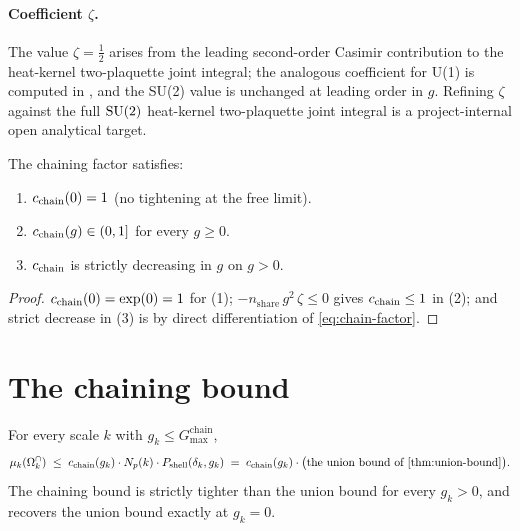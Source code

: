 \paragraph*{Coefficient $\zeta$.}  The value $\zeta = \tfrac12$
arises from the leading second-order Casimir contribution to the
heat-kernel two-plaquette joint integral; the analogous coefficient
for U(1) is computed in \cite{DrouffeItzykson1978}, and the SU(2)
value is unchanged at leading order in $g$.  Refining $\zeta$
against the full $\mathrm{SU}(2)$ heat-kernel two-plaquette joint integral
is a project-internal open analytical target.

\begin{proposition}
\label{prop:chain-factor-properties}
The chaining factor satisfies:
\begin{enumerate}[label=(\arabic*)]
  \item $c_{\mathrm{chain}}(0) = 1$ (no tightening at the free limit).
  \item $c_{\mathrm{chain}}(g) \in (0, 1]$ for every $g \ge 0$.
  \item $c_{\mathrm{chain}}$ is strictly decreasing in $g$ on $g > 0$.
\end{enumerate}
\end{proposition}

\begin{proof}
$c_{\mathrm{chain}}(0) = \exp(0) = 1$ for (1); $-n_{\mathrm{share}}\, g^2\,
\zeta \le 0$ gives $c_{\mathrm{chain}} \le 1$ in (2); and strict decrease in
(3) is by direct differentiation of \eqref{eq:chain-factor}.
\end{proof}

\section{The chaining bound}
\label{sec:chaining-bound}

%

\begin{theorem}
\label{thm:chaining-bound}
For every scale $k$ with $g_k \le G_{\max}^{\mathrm{chain}}$,
\begin{equation}
  \label{eq:chaining-bound}
  \muk(\Omkcap)
  \;\le\;
  \cchain(g_k) \cdot N_p(k) \cdot P_{\mathrm{shell}}(\delta_k, g_k)
  \;=\;
  \cchain(g_k) \cdot \bigl(\text{the union bound of \cref{thm:union-bound}}\bigr).
\end{equation}
The chaining bound is strictly tighter than the union bound for
every $g_k > 0$, and recovers the union bound exactly at $g_k = 0$.
\end{theorem}

